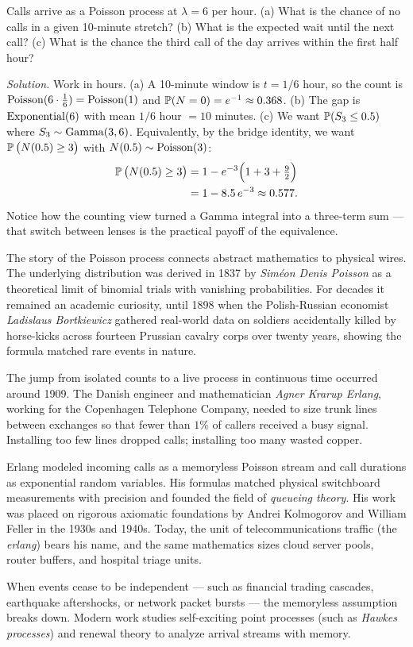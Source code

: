 \begin{example}
\label{ch25:ex-helpdesk}
Calls arrive as a Poisson process at $\lambda = 6$ per hour. (a) What is the
chance of no calls in a given 10-minute stretch? (b) What is the expected wait
until the next call? (c) What is the chance the third call of the day arrives
within the first half hour?

\emph{Solution.} Work in hours. (a) A 10-minute window is $t = 1/6$ hour, so the
count is $\Pois(6 \cdot \tfrac16) = \Pois(1)$ and $\P(N=0) = e^{-1} \approx
0.368$. (b) The gap is $\Expo(6)$ with mean $1/6$ hour $= 10$ minutes. (c) We
want $\P(S_3 \le 0.5)$ where $S_3 \sim \Gam(3,6)$. Equivalently, by the bridge
identity, we want $\P\big(N(0.5) \ge 3\big)$ with $N(0.5) \sim \Pois(3)$:
\begin{align*}
\P\big(N(0.5)\ge 3\big) &= 1 - e^{-3}\Big(1 + 3 + \tfrac{9}{2}\Big) \\
&= 1 - 8.5\,e^{-3} \approx 0.577.
\end{align*}
Notice how the counting view turned a Gamma integral into a three-term sum ---
that switch between lenses is the practical payoff of the equivalence.
\end{example}

\begin{historybox}
The story of the Poisson process connects abstract mathematics to physical wires.
The underlying distribution was derived in 1837 by \emph{Sim\'eon Denis Poisson}
as a theoretical limit of binomial trials with vanishing probabilities. For decades
it remained an academic curiosity, until 1898 when the Polish-Russian economist
\emph{Ladislaus Bortkiewicz} gathered real-world data on soldiers accidentally
killed by horse-kicks across fourteen Prussian cavalry corps over twenty years,
showing the formula matched rare events in nature.

The jump from isolated counts to a live process in continuous time occurred around
1909. The Danish engineer and mathematician \emph{Agner Krarup Erlang}, working
for the Copenhagen Telephone Company, needed to size trunk lines between exchanges
so that fewer than $1\%$ of callers received a busy signal. Installing too few
lines dropped calls; installing too many wasted copper.

Erlang modeled incoming calls as a memoryless Poisson stream and call durations
as exponential random variables. His formulas matched physical switchboard
measurements with precision and founded the field of \emph{queueing theory}.
His work was placed on rigorous axiomatic foundations by Andrei Kolmogorov and
William Feller in the 1930s and 1940s. Today, the unit of telecommunications
traffic (the \emph{erlang}) bears his name, and the same mathematics sizes cloud
server pools, router buffers, and hospital triage units.

When events cease to be independent --- such as financial trading cascades,
earthquake aftershocks, or network packet bursts --- the memoryless assumption
breaks down. Modern work studies self-exciting point processes (such as
\emph{Hawkes processes}) and renewal theory to analyze arrival streams with
memory.
\end{historybox}

